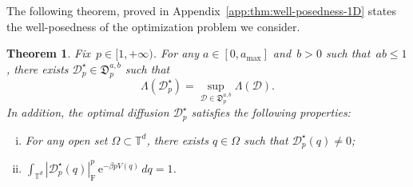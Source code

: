 \documentclass{article}
\newtheorem{theorem}{Theorem}
\newcommand{\dps}{\displaystyle }
\newcommand{\rme}{\mathrm{e}}
\newcommand{\cQ}{\mathcal{Q}}
\renewcommand{\leq}{\leqslant}
\renewcommand{\le}{\leqslant}
\def\T{\mathbb{T}}
\newcommand{\Diff}{\mathcal{D}}
\newcommand{\Diffset}{\mathfrak{D}}
\newcommand{\F}{\mathrm{F}}
\newcommand{\normF}[1]{\left| #1 \right|_{\F}}
\renewcommand{\dim}{d}
\begin{document}

The following theorem, proved in Appendix~\ref{app:thm:well-posedness-1D} states the well-posedness of the optimization problem we consider.

\begin{theorem}
  \label{thm:well-posedness-1D}
  Fix~$p \in [1,+\infty)$. For any $a \in [0,a_\mathrm{max}]$ and~$b > 0$ such that~$ab \leq 1$, there exists $\Diff^{\star}_p \in \Diffset_p^{a,b}$ such that
  \begin{equation}
    \label{eq:maximizer_in_thm}
    \Lambda(\Diff^{\star}_p) = \sup_{\Diff\in\Diffset_p^{a,b}} \Lambda(\Diff).
  \end{equation}
  In addition, the optimal diffusion $\Diff^{\star}_p$ satisfies the following properties:
  \begin{enumerate}[(i)]
  \item For any open set $\Omega \subset \T^\dim$, there exists $q\in\Omega$ such that $\Diff^{\star}_p(q)\neq 0$;
  \item $\dps \int_{\T^\dim}\normF{\Diff^{\star}_p(q)}^p \, \rme^{-\beta p V(q)} \, dq =1$.
  \end{enumerate}
\end{theorem}
\end{document}
